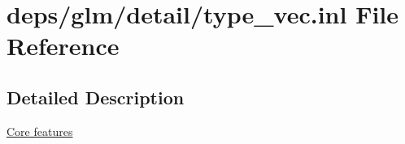 \hypertarget{type__vec_8inl}{}\section{deps/glm/detail/type\+\_\+vec.inl File Reference}
\label{type__vec_8inl}


\subsection{Detailed Description}
\hyperlink{group__core}{Core features} 